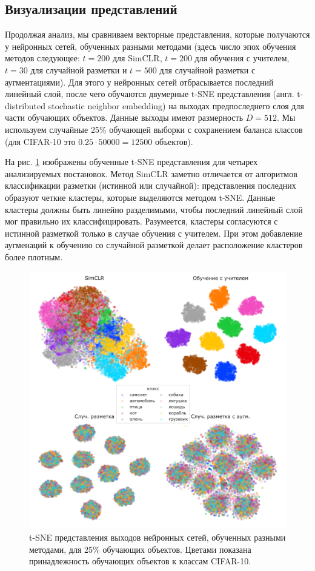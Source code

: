 \subsection{Визуализации представлений}
\label{visual:1}

Продолжая анализ, мы сравниваем векторные представления, которые получаются у нейронных сетей, обученных разными методами (здесь число эпох обучения методов следующее: $t=200$ для SimCLR, $t=200$ для обучения с учителем, $t=30$ для случайной разметки и $t=500$ для случайной разметки с аугментациями). Для этого у нейронных сетей отбрасывается последний линейный слой, после чего обучаются двумерные t-SNE представления (англ. t-distributed stochastic neighbor embedding) \cite{tsne} на выходах предпоследнего слоя для части обучающих объектов. Данные выходы имеют размерность $D=512$. Мы используем случайные 25\% обучающей выборки с сохранением баланса классов (для CIFAR-10 это $0.25 \cdot 50000 = 12500$ объектов).

На рис. \ref{visual:pic:1} изображены обученные t-SNE представления для четырех анализируемых постановок. Метод SimCLR заметно отличается от алгоритмов классификации разметки (истинной или случайной): представления последних образуют четкие кластеры, которые выделяются методом t-SNE. Данные кластеры должны быть линейно разделимыми, чтобы последний линейный слой мог правильно их классифицировать. Разумеется, кластеры согласуются с истинной разметкой только в случае обучения с учителем. При этом добавление аугменаций к обучению со случайной разметкой делает расположение кластеров более плотным.

\begin{figure}[H]
    \centering
    \includegraphics[width=17cm]{images/tsne.pdf}
    \caption{t-SNE представления выходов нейронных сетей, обученных разными методами, для 25\% обучающих объектов. Цветами показана принадлежность обучающих объектов к классам CIFAR-10.}
    \label{visual:pic:1}
\end{figure}{}


